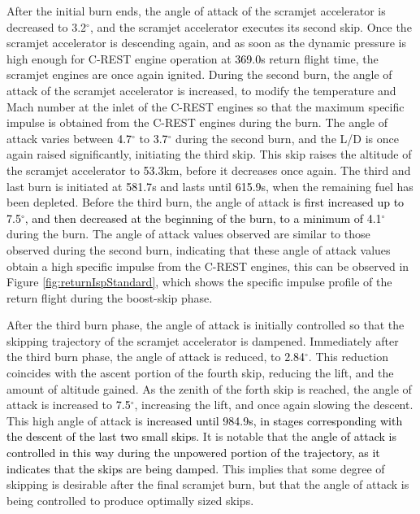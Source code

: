 After the initial burn ends, the angle of attack of the scramjet accelerator is decreased to 3.2$^\circ$, and the scramjet accelerator executes its second skip. Once the scramjet accelerator is descending again, and as soon as the dynamic pressure is high enough for C-REST engine operation at \textcolor{black}{369.0}s return flight time, the scramjet engines are once again ignited.
During the second burn, the angle of attack of the scramjet accelerator is increased, to modify the temperature and Mach number at the inlet of the C-REST engines so that the maximum specific impulse is obtained from the C-REST engines during the burn. 
The angle of attack varies between \textcolor{black}{4.7}$^\circ$ to \textcolor{black}{3.7}$^\circ$ during the second burn, and the L/D is once again raised significantly, initiating the third skip. 
This skip raises the altitude of the scramjet accelerator to \textcolor{black}{53.3}km, before it decreases once again. 
The third and last burn is initiated at \textcolor{black}{581.7}s and lasts until \textcolor{black}{615.9}s, when the remaining fuel has been depleted. Before the third burn, the angle of attack is \textcolor{black}{first increased up to 7.5$^\circ$, and then decreased at the beginning of the burn, to a minimum of 4.1}$^\circ$ during the burn. The angle of attack values observed are similar to those observed during the second burn, indicating that these angle of attack values obtain a high specific impulse from the C-REST engines, this can be observed in Figure \ref{fig:returnIspStandard}, which shows the specific impulse profile of the return flight during the boost-skip phase. 

After the third burn phase, the angle of attack is initially controlled so that the skipping trajectory of the scramjet accelerator is dampened.
Immediately after the third burn phase, the angle of attack is reduced, to \textcolor{black}{2.84}$^\circ$. This reduction coincides with the ascent portion of the fourth skip, reducing the lift, and the amount of altitude gained. 
As the zenith of the forth skip is reached, the angle of attack is increased to \textcolor{black}{7.5}$^\circ$, increasing the lift, and once again slowing the descent. 
This high angle of attack is \textcolor{black}{increased until 984.9s, in stages corresponding with the descent of the last two small skips}.
It is notable that the \textcolor{black}{angle of attack is controlled in this way during the unpowered portion of the trajectory, as it indicates that the skips are being damped.} This implies that some degree of skipping is desirable after the final scramjet burn, but that the angle of attack is being controlled to produce optimally sized skips. 

